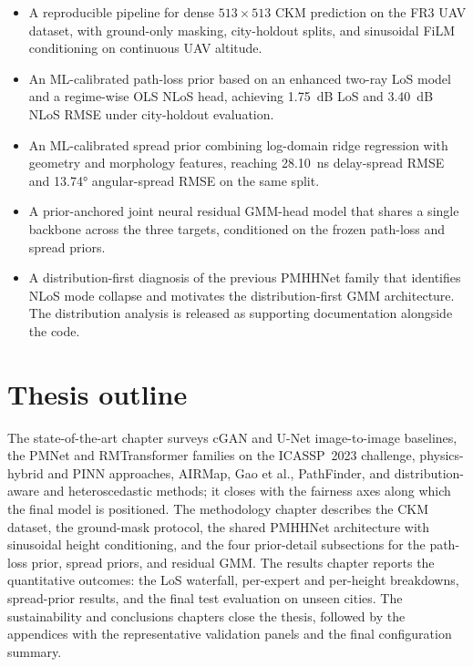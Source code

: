 \begin{itemize}
  \item A reproducible pipeline for dense \(513\times513\) CKM prediction on
        the FR3 UAV dataset, with ground-only masking, city-holdout splits,
        and sinusoidal FiLM conditioning on continuous UAV altitude.
  \item An ML-calibrated path-loss prior based on an
        enhanced two-ray LoS model and a regime-wise OLS NLoS head,
        achieving \SI{1.75}{dB} LoS and \SI{3.40}{dB} NLoS RMSE under
        city-holdout evaluation.
  \item An ML-calibrated spread prior combining
        log-domain ridge regression with geometry and morphology features,
        reaching \SI{28.10}{ns} delay-spread RMSE and
        \ang{13.74} angular-spread RMSE on the same split.
  \item A prior-anchored joint neural residual GMM-head model that shares
        a single backbone across the three targets, conditioned on the frozen
        path-loss and spread priors.
  \item A distribution-first diagnosis of the previous PMHHNet family
        that identifies NLoS mode collapse and motivates the
        distribution-first GMM architecture. The distribution analysis is released as
        supporting documentation alongside the code.
\end{itemize}

\section{Thesis outline}

The state-of-the-art chapter surveys cGAN and U-Net image-to-image baselines,
the PMNet and RMTransformer families on the ICASSP~2023 challenge,
physics-hybrid and PINN approaches, AIRMap, Gao et al., PathFinder, and
distribution-aware and heteroscedastic methods; it closes with the fairness
axes along which the final model is positioned. The methodology chapter describes the
CKM dataset, the ground-mask protocol, the shared
PMHHNet architecture with sinusoidal height conditioning, and the four
prior-detail subsections for the path-loss prior, spread priors, and residual
GMM. The results chapter reports the quantitative outcomes: the LoS waterfall,
per-expert and per-height breakdowns, spread-prior results, and the final test evaluation on
unseen cities. The sustainability and conclusions chapters close the thesis,
followed by the appendices with the representative validation panels and the final
configuration summary.

